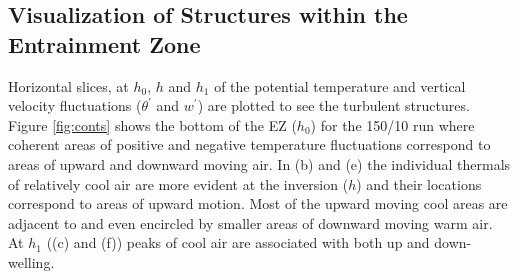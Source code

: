 \clearpage

\subsection{Visualization of Structures within the Entrainment Zone}
\FloatBarrier

Horizontal slices, at $h_{0}$, $h$ and $h_{1}$  of the potential temperature 
and vertical velocity fluctuations ($\theta^{'}$ and $w^{'}$) are plotted to see the turbulent structures.  Figure \ref{fig:conts} shows the bottom of the \acs{EZ} ($h_{0}$) for the 150/10 run where coherent areas of positive and negative temperature fluctuations 
correspond to areas of upward and downward moving air.  In (b) and (e) the individual thermals of relatively cool air are more evident at the inversion ($h$) and their locations correspond to areas of upward motion.  Most of the upward moving cool areas are adjacent to and even 
encircled by smaller areas of downward moving warm air.  At $h_{1}$ ((c) and (f)) peaks of cool air are associated 
with both up and down-welling.\\  

